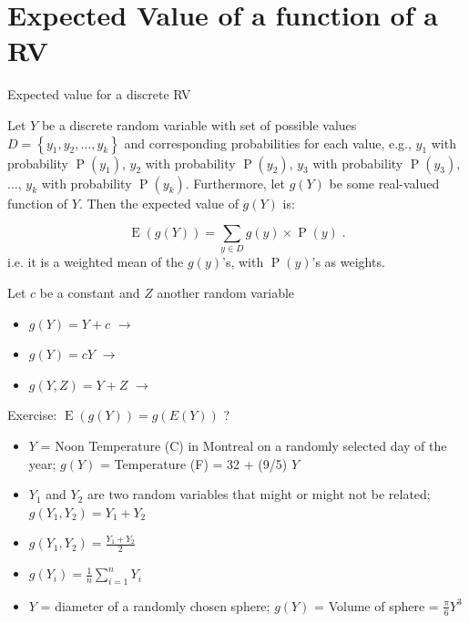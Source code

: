 \documentclass[10pt,handout]{beamer}\usepackage[]{graphicx}\usepackage[]{color}
\newcommand{\Expec}{\operatorname{E}}
\newcommand{\Prob}{\operatorname{P}}
\begin{document}
\section{Expected Value of a function of a RV}

\begin{frame}{Expected value for a discrete RV}
	
	\begin{definition}
		Let $Y$ be a discrete random variable with set of possible values $D=\left\lbrace y_1, y_2, \ldots,y_k  \right\rbrace$ and corresponding probabilities for each value, e.g., $y_1$ with probability $\Prob(y_1)$, $y_2$ with probability $\Prob(y_2)$, $y_3$ with probability $\Prob(y_3)$, $\ldots$, $y_k$ with probability $\Prob(y_k)$. Furthermore, let $g(Y)$ be some real-valued function of $Y$. Then the expected value of $g(Y)$ is:
		
		$$\operatorname{E}(g(Y)) =  \sum_{y \in D} g(y) \times \operatorname{P}(y)\;.$$
		i.e. it is a weighted mean of the $g(y)$'s, with $\Prob(y)$'s as weights.
	\end{definition}
	\pause 
	Let $c$ be a constant and $Z$ another random variable
	\begin{itemize}
		\item $g(Y) = Y + c$ $\rightarrow$ \pause 
		\item $g(Y) = cY$ $\rightarrow$ \pause
		\item $g(Y,Z) = Y + Z$ $\rightarrow$ 
	\end{itemize}
	
\end{frame}



\begin{frame}{Exercise: $\Expec(g(Y)) = g(E(Y))$ ?}
	
\begin{itemize}[<+->]
\setlength{\itemsep}{10pt}		
\item $Y$ = Noon Temperature (C) in Montreal on a randomly selected day of the year;  
$g(Y)$ = Temperature (F) = 32 + (9/5) $Y$
\item  $Y_1$ and $Y_2$ are two random variables that might or might not be related; $g(Y_1, Y_2) = Y_1 + Y_2$ 
\item  $g(Y_1, Y_2) = \frac{Y_1 + Y_2}{2}$  
\item $g(Y_i) = \frac{1}{n} \sum_{i=1}^{n} Y_i$
\item  $Y$ = diameter of a randomly chosen sphere; $g(Y)$ = Volume of sphere = $\frac{\pi}{6}  Y^3$
\end{itemize}
	
\end{frame}
\end{document}
